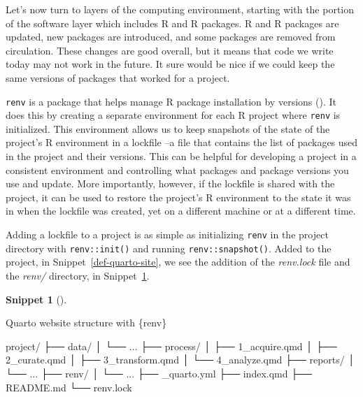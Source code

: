 \documentclass[
  letterpaper,
  krantz1]{latex/krantz-mod}
\newenvironment{Shaded}{\begin{snugshade}}{\end{snugshade}}
\newcommand{\ExtensionTok}[1]{\textcolor[rgb]{0.00,0.00,0.00}{#1}}
\newcommand{\NormalTok}[1]{\textcolor[rgb]{0.00,0.00,0.00}{#1}}
\theoremstyle{definition}
\theoremstyle{definition}
\newtheorem{definition}{Snippet}[chapter]
\theoremstyle{remark}
\begin{document}
Let's now turn to layers of the computing environment, starting with the
portion of the software layer which includes R and R packages. R and R
packages are updated, new packages are introduced, and some packages are
removed from circulation. These changes are good overall, but it means
that code we write today may not work in the future. It sure would be
nice if we could keep the same versions of packages that worked for a
project.

\texttt{renv} is a package that helps manage R package installation by
versions (). It does this
by creating a separate environment for each R project where
\texttt{renv} is initialized. This environment allows us to keep
snapshots of the state of the project's R environment in a lockfile --a
file that contains the list of packages used in the project and their
versions. This can be helpful for developing a project in a consistent
environment and controlling what packages and package versions you use
and update. More importantly, however, if the lockfile is shared with
the project, it can be used to restore the project's R environment to
the state it was in when the lockfile was created, yet on a different
machine or at a different time.

Adding a lockfile to a project is as simple as initializing
\texttt{renv} in the project directory with \texttt{renv::init()} and
running \texttt{renv::snapshot()}. Added to the project, in
Snippet~\ref{def-quarto-site}, we see the addition of the
\emph{renv.lock} file and the \emph{renv/} directory, in
Snippet~\ref{def-quarto-renv}.

\begin{definition}[]\protect\hypertarget{def-quarto-renv}{}\label{def-quarto-renv}

Quarto website structure with \{renv\}

\begin{Shaded}
\begin{Highlighting}[]
\ExtensionTok{project/}
  \ExtensionTok{├──}\NormalTok{ data/}
  \ExtensionTok{│}\NormalTok{   └── ...}
  \ExtensionTok{├──}\NormalTok{ process/}
  \ExtensionTok{│}\NormalTok{   ├── 1\_acquire.qmd}
  \ExtensionTok{│}\NormalTok{   ├── 2\_curate.qmd}
  \ExtensionTok{│}\NormalTok{   ├── 3\_transform.qmd}
  \ExtensionTok{│}\NormalTok{   └── 4\_analyze.qmd}
  \ExtensionTok{├──}\NormalTok{ reports/}
  \ExtensionTok{│}\NormalTok{   └── ...}
  \ExtensionTok{├──}\NormalTok{ renv/}
  \ExtensionTok{│}\NormalTok{   └── ...}
  \ExtensionTok{├──}\NormalTok{ \_quarto.yml}
  \ExtensionTok{├──}\NormalTok{ index.qmd}
  \ExtensionTok{├──}\NormalTok{ README.md}
  \ExtensionTok{└──}\NormalTok{ renv.lock}
\end{Highlighting}
\end{Shaded}

\end{definition}
\end{document}
